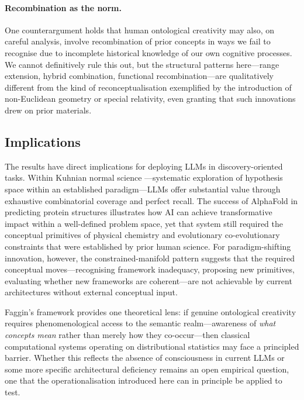 \documentclass[pdflatex,sn-mathphys-num]{sn-jnl}
\begin{document}
\paragraph{Recombination as the norm.}  One counterargument holds that human ontological
creativity may also, on careful analysis, involve recombination of prior concepts in ways we
fail to recognise due to incomplete historical knowledge of our own cognitive processes.  We
cannot definitively rule this out, but the structural patterns here---range extension, hybrid
combination, functional recombination---are qualitatively different from the kind of
reconceptualisation exemplified by the introduction of non-Euclidean geometry or special
relativity, even granting that such innovations drew on prior materials.

\subsection{Implications}

The results have direct implications for deploying LLMs in discovery-oriented tasks.  Within
Kuhnian normal science \cite{kuhn1962structure}---systematic exploration of hypothesis space
within an established paradigm---LLMs offer substantial value through exhaustive combinatorial
coverage and perfect recall.  The success of AlphaFold in predicting protein structures
\cite{jumper2021alphafold} illustrates how AI can achieve transformative impact within a
well-defined problem space, yet that system still required the conceptual primitives of
physical chemistry and evolutionary co-evolutionary constraints that were established by prior
human science.  For paradigm-shifting innovation, however, the constrained-manifold
pattern suggests that the required conceptual moves---recognising framework inadequacy, proposing
new primitives, evaluating whether new frameworks are coherent---are not achievable by current
architectures without external conceptual input.

Faggin's framework \cite{faggin2024irreducible} provides one theoretical lens: if genuine
ontological creativity requires phenomenological access to the semantic realm---awareness of
\emph{what concepts mean} rather than merely how they co-occur---then classical computational
systems operating on distributional statistics may face a principled barrier.  Whether this
reflects the absence of consciousness in current LLMs or some more specific architectural
deficiency remains an open empirical question, one that the operationalisation introduced here
can in principle be applied to test.
\end{document}
